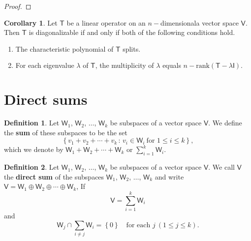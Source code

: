 \documentclass[12pt]{book}
\theoremstyle{definition}
\newtheorem*{corollary*}{Corollary}
\newtheorem*{definition}{Definition}
\begin{document}
	\begin{proof}
	\end{proof}
	\newpage
	\begin{corollary*}
		Let $\mathsf{T}$ be a linear operator on an $n-$dimensionala vector space $\mathsf{V}$. Then $\mathsf{T}$ is diagonalizable if and only if both of the following conditions hold.
		\begin{enumerate}
			\item The characteristic polynomial of $\mathsf{T}$ splits.
			\item For each eigenvalue $\lambda$ of $\mathsf{T}$, the multiplicity of $\lambda$ equals $n-\text{rank}(\mathsf{T}-\lambda \mathsf{I})$.
		\end{enumerate}
	\end{corollary*}
	\newpage
	\section*{Direct sums}
	\begin{definition}
		Let $\mathsf{W}_1$, $\mathsf{W}_2$, $\ldots$, $\mathsf{W}_k$ be subspaces of a vector space $\mathsf{V}$. We define the \textbf{sum} of these subspaces to be the set $$\left\{v_1+v_2+\cdots+v_k\,:\,v_i\in\mathsf{W}_i~\text{for }1\leq i\leq k\right\},$$
		which we denote by $\mathsf{W}_1+\mathsf{W}_2+\cdots+\mathsf{W}_k$ or $\displaystyle\sum_{i=1}^k \mathsf{W}_i$.
	\end{definition}
	\vspace*{\fill}
	\begin{definition}
		Let $\mathsf{W}_1$, $\mathsf{W}_2$, $\ldots$, $\mathsf{W}_k$ be subspaces of a vector space $\mathsf{V}$. We call $\mathsf{V}$ the \textbf{direct sum} of the subspaces $\mathsf{W}_1$, $\mathsf{W}_2$, $\ldots$, $\mathsf{W}_k$ and write $\mathsf{V}=\mathsf{W}_1\oplus\mathsf{W}_2\oplus\cdots\oplus\mathsf{W}_k$, If$$\mathsf{V}=\displaystyle\sum_{i=1}^k\mathsf{W}_i$$ and $$\mathsf{W}_j\cap\displaystyle\sum_{i\neq j}\mathsf{W}_i=\left\{0\right\}\quad\text{for each }j\ (1\leq j\leq k).$$
	\end{definition}
	\vspace*{\fill}
	\vspace*{\fill}
	\newpage
\end{document}

